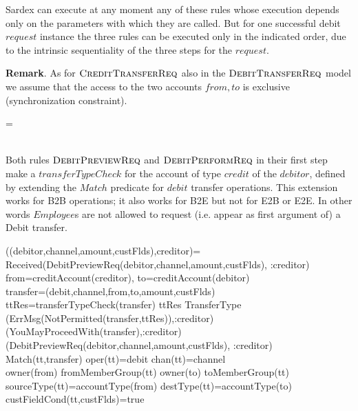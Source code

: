 Sardex can execute at any moment any of these rules whose execution depends only on the parameters with which they are called. But for one successful debit $request$ instance the three rules can be executed only in the indicated order, due to the intrinsic sequentiality of the three steps for the $request$.

{\bf Remark}. As for $\hbox{\sc CreditTransferReq}$ also in the $\hbox{\sc DebitTransferReq}$ model we assume that the access to the two accounts $from, to$ is exclusive (synchronization constraint). 


\begin{asm}
=\+
    \\
    \\
\end{asm}


Both rules $\hbox{\sc DebitPreviewReq}$ and $\hbox{\sc DebitPerformReq}$ in their first step make a $transferTypeCheck$ for the account of type $credit$ of the $debitor$, defined by extending the $Match$ predicate for $debit$ transfer operations. This extension works for B2B operations; it also works for B2E but not for E2B or E2E. In other words $Employee$s are not allowed to request (i.e. appear as first argument of) a Debit transfer.

\begin{asm}
((debitor,channel,amount,custFlds),creditor)=\+
  \IF Received(DebitPreviewReq(debitor,channel,amount,custFlds),
                   \FROM :creditor) \THEN \+  
     \LET from=creditAccount(creditor), to=creditAccount(debitor)\\
     \LET transfer=(debit,channel,from,to,amount,custFlds)\\  
     \LET ttRes=transferTypeCheck(transfer) \+
        \IF ttRes \not \in TransferType \THEN \+    (ErrMsg(NotPermitted(transfer,ttRes)),\TO :creditor)\-
       \ELSE~  (YouMayProceedWith(transfer),\TO :creditor)\dec\-
   (DebitPreviewReq(debitor,channel,amount,custFlds),
                   \FROM :creditor) \-
\WHERE \+
   Match(tt,transfer) \IF \+
      oper(tt)=debit \AND chan(tt)=channel \AND \\
          owner(from) \in fromMemberGroup(tt) \AND 
              owner(to) \in toMemberGroup(tt)  \AND \\
          sourceType(tt)=accountType(from) \AND destType(tt)=accountType(to) \AND \\
              custFieldCond(tt,custFlds)=true
\end{asm}


